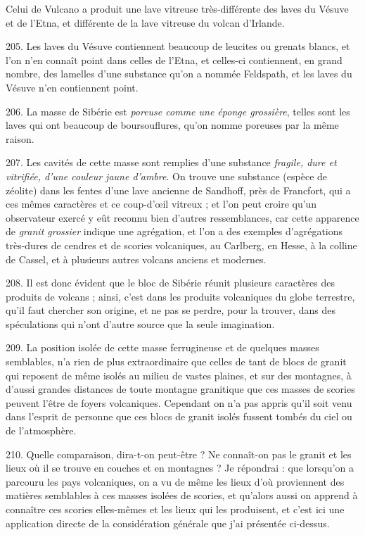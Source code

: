 \documentclass[a4paper, 11pt, oneside, polutonikogreek, french]{article}
\begin{document}
Celui de Vulcano a produit une lave vitreuse très-différente des laves du Vésuve et de l'Etna, et différente de la lave vitreuse du volcan d'Irlande.

205. Les laves du Vésuve contiennent beaucoup de leucites ou grenats blancs, et l'on n'en connaît point dans celles de l'Etna, et celles-ci contiennent, en grand nombre, des lamelles d'une substance qu'on a nommée Feldspath, et les laves du Vésuve n'en contiennent point.

206. La masse de Sibérie est \emph{poreuse comme une éponge grossière}, telles sont les laves qui ont beaucoup de boursouflures, qu'on nomme poreuses par la même raison.

207. Les cavités de cette masse sont remplies d'une substance \emph{fragile, dure et vitrifiée, d'une couleur jaune d'ambre}. On trouve une substance (espèce de zéolite) dans les fentes d'une lave ancienne de Sandhoff, près de Francfort, qui a ces mêmes caractères et ce coup-d'œil vitreux ; et l'on peut croire qu'un observateur exercé y eût reconnu bien d'autres ressemblances, car cette apparence de \emph{granit grossier} indique une agrégation, et l'on a des exemples d'agrégations très-dures de cendres et de scories volcaniques, au Carlberg, en Hesse, à la colline de Cassel, et à plusieurs autres volcans anciens et modernes.

208. Il est donc évident que le bloc de Sibérie réunit plusieurs caractères des produits de volcans ; ainsi, c'est dans les produits volcaniques du globe terrestre, qu'il faut chercher son origine, et ne pas se perdre, pour la trouver, dans des spéculations qui n'ont d'autre source que la seule imagination.

209. La position isolée de cette masse ferrugineuse et de quelques masses semblables, n'a rien de plus extraordinaire que celles de tant de blocs de granit qui reposent de même isolés au milieu de vastes plaines, et sur des montagnes, à d'aussi grandes distances de toute montagne granitique que ces masses de scories peuvent l'être de foyers volcaniques. Cependant on n'a pas appris qu'il soit venu dans l'esprit de personne que ces blocs de granit isolés fussent tombés du ciel ou de l'atmosphère.

210. Quelle comparaison, dira-t-on peut-être ? Ne connaît-on pas le granit et les lieux où il se trouve en couches et en montagnes ? Je répondrai : que lorsqu'on a parcouru les pays volcaniques, on a vu de même les lieux d'où proviennent des matières semblables à ces masses isolées de scories, et qu'alors aussi on apprend à connaître ces scories elles-mêmes et les lieux qui les produisent, et c'est ici une application directe de la considération générale que j'ai présentée ci-dessus.
\end{document}
